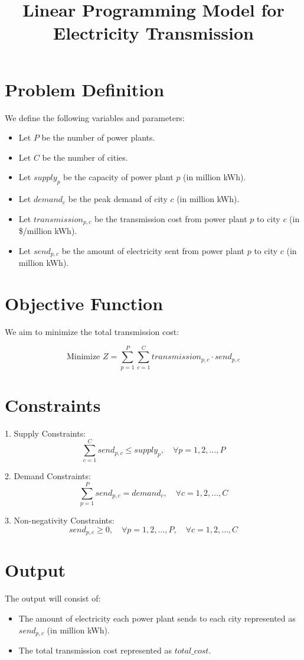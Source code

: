 \documentclass{article}
\begin{document}
\title{Linear Programming Model for Electricity Transmission}
\author{}
\date{}
\maketitle

\section*{Problem Definition}
We define the following variables and parameters:

\begin{itemize}
    \item Let \( P \) be the number of power plants.
    \item Let \( C \) be the number of cities.
    \item Let \( supply_{p} \) be the capacity of power plant \( p \) (in million kWh).
    \item Let \( demand_{c} \) be the peak demand of city \( c \) (in million kWh).
    \item Let \( transmission_{p,c} \) be the transmission cost from power plant \( p \) to city \( c \) (in \$/million kWh).
    \item Let \( send_{p,c} \) be the amount of electricity sent from power plant \( p \) to city \( c \) (in million kWh).
\end{itemize}

\section*{Objective Function}
We aim to minimize the total transmission cost:

\[
\text{Minimize } Z = \sum_{p=1}^{P} \sum_{c=1}^{C} transmission_{p,c} \cdot send_{p,c}
\]

\section*{Constraints}

1. Supply Constraints:
\[
\sum_{c=1}^{C} send_{p,c} \leq supply_{p}, \quad \forall p = 1, 2, \ldots, P
\]

2. Demand Constraints:
\[
\sum_{p=1}^{P} send_{p,c} = demand_{c}, \quad \forall c = 1, 2, \ldots, C
\]

3. Non-negativity Constraints:
\[
send_{p,c} \geq 0, \quad \forall p = 1, 2, \ldots, P, \quad \forall c = 1, 2, \ldots, C
\]

\section*{Output}
The output will consist of:
\begin{itemize}
    \item The amount of electricity each power plant sends to each city represented as \( send_{p,c} \) (in million kWh).
    \item The total transmission cost represented as \( total\_cost \).
\end{itemize}
\end{document}
